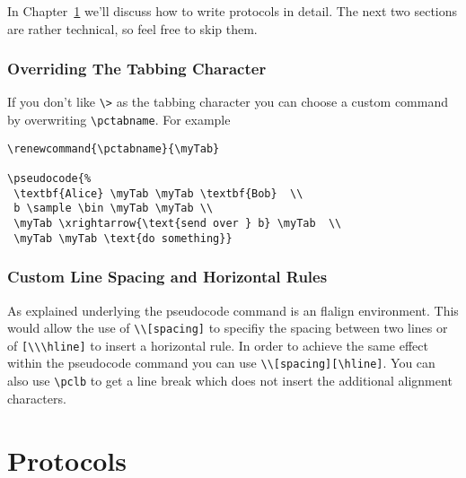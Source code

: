 \documentclass[a4paper]{report}
\begin{document}
In Chapter~\ref{chap:protocols} we'll discuss how to write protocols in detail.
The next two sections are rather technical, so feel free to skip them.


\subsection{Overriding The Tabbing Character}
If you don't like \lstinline$\>$ as the tabbing character you can choose a custom command by overwriting \lstinline$\pctabname$.
For example
\begin{lstlisting}
\renewcommand{\pctabname}{\myTab}

\pseudocode{%
 \textbf{Alice} \myTab \myTab \textbf{Bob}  \\
 b \sample \bin \myTab \myTab \\
 \myTab \xrightarrow{\text{send over } b} \myTab  \\
 \myTab \myTab \text{do something}}
\end{lstlisting}

\subsection{Custom Line Spacing and Horizontal Rules}
As explained underlying the pseudocode command is an flalign environment. This would allow the use
of \lstinline$\\[spacing]$ to specifiy the spacing between two lines or of \lstinline$[\\\hline]$
to insert a horizontal rule. In order to achieve the same effect within the pseudocode command you
can use \lstinline$\\[spacing][\hline]$. You can also use \lstinline$\pclb$ to get a line break which
does not insert the additional alignment characters.

\chapter{Protocols}
\label{chap:protocols}
\end{document}
